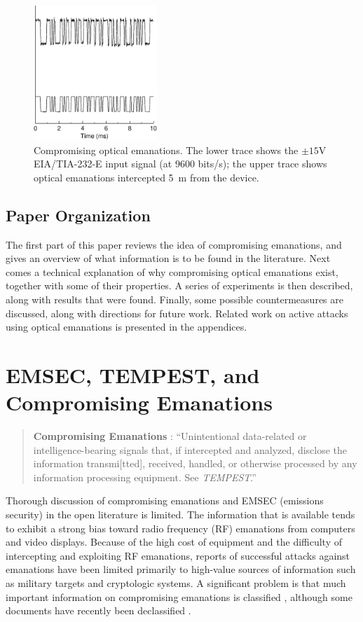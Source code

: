 \documentclass{acmtrans2e}
\begin{document}
\begin{figure}
\centering
\includegraphics[height=2in]{Figure_1.eps}
\caption{Compromising optical emanations.  The lower trace shows the
$\pm15$V EIA/TIA-232-E input signal (at 9600 bits/s); the upper
trace shows optical emanations intercepted 5~m from the device.}
\label{example_of_optical_emanations_figure}
\end{figure}

\subsection{Paper Organization}

The first part of this paper reviews the idea of compromising 
emanations, and gives an overview of what information is to be found in 
the literature.  Next comes a technical explanation of why compromising 
optical emanations exist, together with some of their properties.  A series of 
experiments is then described, along with results that were found.  
Finally, some possible countermeasures are discussed, along with 
directions for future work. Related work on active attacks using optical 
emanations is presented in the appendices.

\section{EMSEC, TEMPEST, and Compromising Emanations}

\begin{quotation}
{\bf Compromising Emanations} \cite{ncsc_tg_004}: ``Unintentional
data-related or intelligence-bearing signals that, if 
intercepted and analyzed, disclose the information transmi[tted],
received, handled, or otherwise processed by any information processing 
equipment. See {\it TEMPEST}.''
\end{quotation}

Thorough discussion of compromising emanations and EMSEC (emissions
security) in the open literature is limited.  The information that is 
available tends to exhibit a strong bias toward radio frequency 
(RF) emanations from computers and video displays.  Because of the high 
cost of equipment and the difficulty of intercepting and exploiting RF 
emanations, reports of successful attacks against emanations 
have been limited primarily to high-value sources of information such 
as military targets and cryptologic systems.  A significant problem is
that much important information on compromising emanations is
classified \cite{russell_and_gangemi}, although some documents have
recently been declassified \cite{NACSIM_5000,NSTISSAM,shielded_enclosures}.
\end{document}
